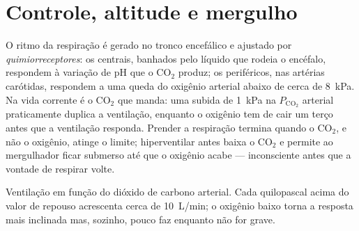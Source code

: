 \section{Controle, altitude e mergulho}

\begin{proposition}\label{prop:b1:gas-exchange:control}
O ritmo da respiração é gerado no tronco encefálico e ajustado por
\emph{quimiorreceptores}: os centrais, banhados pelo líquido que
rodeia o encéfalo, respondem à variação de pH que o $\mathrm{CO_2}$
produz; os periféricos, nas artérias carótidas, respondem a uma queda
do oxigênio arterial abaixo de cerca de \qty{8}{kPa}. Na vida corrente
é o $\mathrm{CO_2}$ que manda: uma subida de \qty{1}{kPa} na
$P_{\mathrm{CO_2}}$ arterial praticamente duplica a ventilação,
enquanto o oxigênio tem de cair um terço antes que a ventilação
responda. Prender a respiração termina quando o $\mathrm{CO_2}$, e não
o oxigênio, atinge o limite; hiperventilar antes baixa o
$\mathrm{CO_2}$ e permite ao mergulhador ficar submerso até que o
oxigênio acabe --- inconsciente antes que a vontade de respirar volte.
\end{proposition}

\begin{omfigure}

{\small Ventilação em função do dióxido de carbono arterial. Cada
quilopascal acima do valor de repouso acrescenta cerca de
\qty{10}{L/min}; o oxigênio baixo torna a resposta mais inclinada mas,
sozinho, pouco faz enquanto não for grave.}
\end{omfigure}

